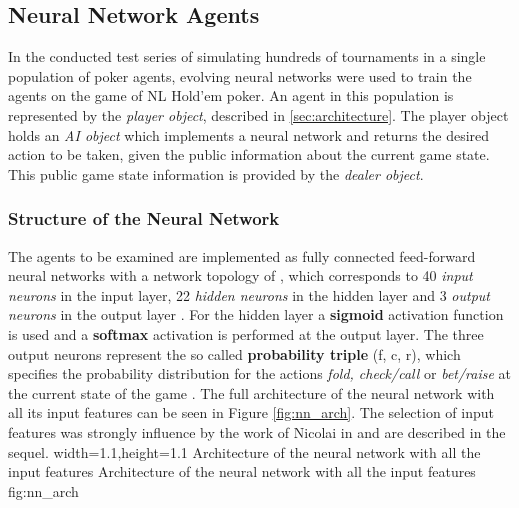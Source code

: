 \subsection{Neural Network Agents}
\label{subsec:nnagent}
In the conducted test series of simulating hundreds of tournaments in a single population of poker agents, evolving neural networks were used to train the agents on the game of NL Hold'em poker. An agent in this population is represented by the \textit{player object}, described in \ref{sec:architecture}. The player object holds an \textit{AI object} which implements a neural network and returns the desired action to be taken, given the public information about the current game state. This public game state information is provided by the \textit{dealer object}.
\subsubsection{Structure of the Neural Network}
The agents to be examined are implemented as fully connected feed-forward neural networks with a network topology of , which corresponds to 40 \textit{input neurons} in the input layer, 22 \textit{hidden neurons} in the hidden layer and 3 \textit{output neurons} in the output layer \cite{ENN_garrett}. For the hidden layer a \textbf{sigmoid} activation function is used and a \textbf{softmax} activation is performed at the output layer. The three output neurons represent the so called \textbf{probability triple} (f, c, r), which specifies the probability distribution for the actions \textit{fold, check/call} or \textit{bet/raise} at the current state of the game \cite{review}. The full architecture of the neural network with all its input features can be seen in Figure \ref{fig:nn_arch}. The selection of input features was strongly influence by the work of Nicolai in \cite{evolutionary_methods} and are described in the sequel. 
  {width=1.1\textwidth,height=1.1\textheight}%
  {Architecture of the neural network with all the input features}%
  {Architecture of the neural network with all the input features}%
  {fig:nn_arch}%
